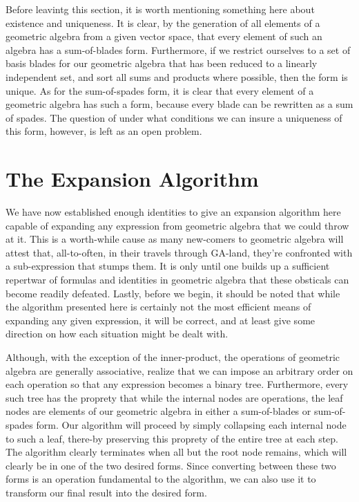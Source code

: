 \documentclass{birkjour}
\theoremstyle{definition}
\theoremstyle{remark}
\numberwithin{equation}{section}
\begin{document}
Before leavintg this section, it is worth mentioning something here about existence and uniqueness.
It is clear, by the generation of all elements of a geometric algebra from a given vector space, that every element of such an algebra
has a sum-of-blades form.  Furthermore, if we restrict ourselves to a set of basis blades for
our geometric algebra that has been reduced to a linearly independent set, and sort all sums and products where possible,
then the form is unique.  As for the sum-of-spades form, it is
clear that every element of a geometric algebra has such a form, because every blade can be rewritten
as a sum of spades.  The question of under what conditions we can insure a uniqueness of this form, however, is
left as an open problem.

\section{The Expansion Algorithm}

We have now established enough identities to give an expansion algorithm here capable of expanding
any expression from geometric algebra that we could throw at it.  This is a worth-while cause as many
new-comers to geometric algebra will attest that, all-to-often, in their travels through GA-land, they're
confronted with a sub-expression that stumps them.  It is only until one builds up a sufficient repertwar of
formulas and identities in geometric algebra that these obsticals can become readily defeated.
Lastly, before we begin, it should be noted that while the algorithm presented here is certainly not the most efficient
means of expanding any given expression, it will be correct, and at least give some direction on how each
situation might be dealt with.

Although, with the exception of the inner-product, the operations of geometric algebra are generally associative,
realize that we can impose an arbitrary order on each operation so that any expression becomes a binary tree.
Furthermore, every such tree has the proprety that while the internal nodes are operations, the leaf nodes
are elements of our geometric algebra in either a sum-of-blades or sum-of-spades form.  Our algorithm
will proceed by simply collapsing each internal node to such a leaf, there-by preserving this proprety of the
entire tree at each step.  The algorithm clearly terminates when all but the root node remains, which will clearly be
in one of the two desired forms.  Since converting between these two forms is an operation fundamental to
the algorithm, we can also use it to transform our final result into the desired form.
\end{document}
